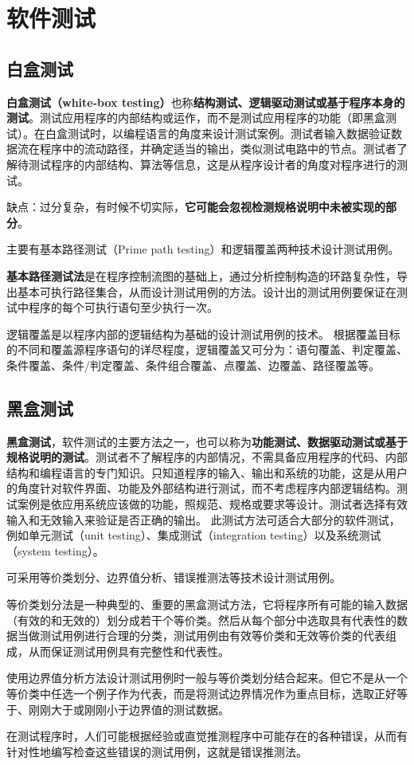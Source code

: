 \section{软件测试}

\subsection{白盒测试}
\textbf{白盒测试（white-box testing）}也称\textbf{结构测试、逻辑驱动测试或基于程序本身的测试}。测试应用程序的内部结构或运作，而不是测试应用程序的功能（即黑盒测试）。在白盒测试时，以编程语言的角度来设计测试案例。测试者输入数据验证数据流在程序中的流动路径，并确定适当的输出，类似测试电路中的节点。测试者了解待测试程序的内部结构、算法等信息，这是从程序设计者的角度对程序进行的测试。

缺点：过分复杂，有时候不切实际，\textbf{它可能会忽视检测规格说明中未被实现的部分}。

主要有基本路径测试（Prime path testing）和逻辑覆盖两种技术设计测试用例。

\textbf{基本路径测试法}是在程序控制流图的基础上，通过分析控制构造的环路复杂性，导出基本可执行路径集合，从而设计测试用例的方法。设计出的测试用例要保证在测试中程序的每个可执行语句至少执行一次。

逻辑覆盖是以程序内部的逻辑结构为基础的设计测试用例的技术。
根据覆盖目标的不同和覆盖源程序语句的详尽程度，逻辑覆盖又可分为：语句覆盖、判定覆盖、条件覆盖、条件/判定覆盖、条件组合覆盖、点覆盖、边覆盖、路径覆盖等。


\subsection{黑盒测试}

\textbf{黑盒测试}，软件测试的主要方法之一，也可以称为\textbf{功能测试、数据驱动测试或基于规格说明的测试}。测试者不了解程序的内部情况，不需具备应用程序的代码、内部结构和编程语言的专门知识。只知道程序的输入、输出和系统的功能，这是从用户的角度针对软件界面、功能及外部结构进行测试，而不考虑程序内部逻辑结构。测试案例是依应用系统应该做的功能，照规范、规格或要求等设计。测试者选择有效输入和无效输入来验证是否正确的输出。
此测试方法可适合大部分的软件测试，例如单元测试（unit testing）、集成测试（integration testing）以及系统测试（system testing）。

可采用等价类划分、边界值分析、错误推测法等技术设计测试用例。

等价类划分法是一种典型的、重要的黑盒测试方法，它将程序所有可能的输入数据（有效的和无效的）划分成若干个等价类。然后从每个部分中选取具有代表性的数据当做测试用例进行合理的分类，测试用例由有效等价类和无效等价类的代表组成，从而保证测试用例具有完整性和代表性。

使用边界值分析方法设计测试用例时一般与等价类划分结合起来。但它不是从一个等价类中任选一个例子作为代表，而是将测试边界情况作为重点目标，选取正好等于、刚刚大于或刚刚小于边界值的测试数据。

在测试程序时，人们可能根据经验或直觉推测程序中可能存在的各种错误，从而有针对性地编写检查这些错误的测试用例，这就是错误推测法。


